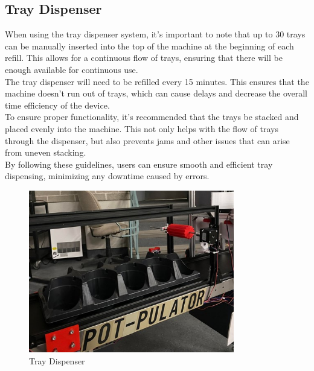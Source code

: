 \documentclass[12pt, titlepage]{article}
\begin{document}
\subsection{Tray Dispenser}
When using the tray dispenser system, it's important to note that up to 30 trays can be manually inserted into the top of the machine at the beginning of each refill. This allows for a continuous flow of trays, ensuring that there will be enough available for continuous use.
\\
\noindent The tray dispenser will need to be refilled every 15 minutes. This ensures that the machine doesn't run out of trays, which can cause delays and decrease the overall time efficiency of the device.
\\
\noindent To ensure proper functionality, it's recommended that the trays be stacked and placed evenly into the machine. This not only helps with the flow of trays through the dispenser, but also prevents jams and other issues that can arise from uneven stacking.
\\
\noindent By following these guidelines, users can ensure smooth and efficient tray dispensing, minimizing any downtime caused by errors.

\begin{figure}[H]
    \centering
    \includegraphics[width=0.8\textwidth]{tray.jpg}
    \caption{Tray Dispenser}
    \label{fig:scope}
  \end{figure}
\newpage
\end{document}
